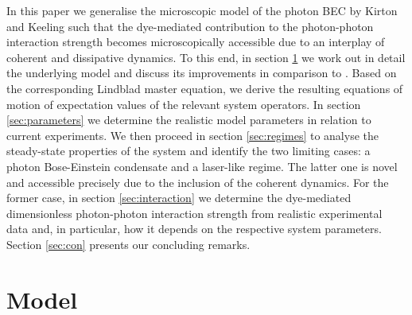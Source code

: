 \documentclass[12pt, a4paper]{iopart}
\begin{document}
In this paper we generalise the microscopic model of the photon BEC by Kirton and Keeling \cite{Keeling_PRL-nonequilibrium_model_photon-cond,Keeling-Thermalization_photon_condensate} such that the dye-mediated contribution to the photon-photon interaction strength becomes microscopically accessible due to an interplay of coherent and dissipative dynamics. To this end, in section \ref{sec:model} we work out in detail the underlying model and discuss its improvements in comparison to \cite{Keeling_PRL-nonequilibrium_model_photon-cond,Keeling-Thermalization_photon_condensate}. Based on the corresponding
Lindblad master equation, we derive the resulting equations of motion of expectation values of the relevant system operators. In section \ref{sec:parameters} we determine the realistic model parameters in relation to current experiments. We then proceed in section \ref{sec:regimes} to analyse the steady-state properties of the system and identify the two limiting cases: a photon Bose-Einstein condensate and a laser-like regime. {The latter one is novel and accessible precisely due to the inclusion of the coherent dynamics.}
For the former case, in section \ref{sec:interaction} we determine the dye-mediated dimensionless photon-photon interaction strength from realistic experimental data and, in particular,
how it depends on the respective system parameters. Section \ref{sec:con} presents our concluding remarks.

\section{Model}
\label{sec:model}
\end{document}
